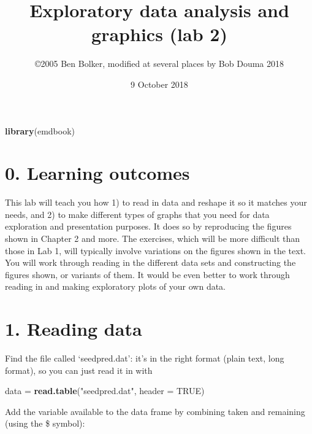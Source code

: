 \documentclass[11pt,]{article}
\title{Exploratory data analysis and graphics (lab 2)}
\author{\copyright 2005 Ben Bolker, modified at several places by Bob Douma 2018}
\date{9 October 2018}
\newenvironment{Shaded}{\begin{snugshade}}{\end{snugshade}}
\newcommand{\KeywordTok}[1]{\textcolor[rgb]{0.13,0.29,0.53}{\textbf{#1}}}
\newcommand{\DataTypeTok}[1]{\textcolor[rgb]{0.13,0.29,0.53}{#1}}
\newcommand{\StringTok}[1]{\textcolor[rgb]{0.31,0.60,0.02}{#1}}
\newcommand{\OtherTok}[1]{\textcolor[rgb]{0.56,0.35,0.01}{#1}}
\newcommand{\OperatorTok}[1]{\textcolor[rgb]{0.81,0.36,0.00}{\textbf{#1}}}
\newcommand{\NormalTok}[1]{#1}
\begin{document}
\maketitle

\begin{Shaded}
\begin{Highlighting}[]
\KeywordTok{library}\NormalTok{(emdbook)}
\end{Highlighting}
\end{Shaded}

\section{0. Learning outcomes}\label{learning-outcomes}

This lab will teach you how 1) to read in data and reshape it so it
matches your needs, and 2) to make different types of graphs that you
need for data exploration and presentation purposes. It does so by
reproducing the figures shown in Chapter 2 and more. The exercises,
which will be more difficult than those in Lab 1, will typically involve
variations on the figures shown in the text. You will work through
reading in the different data sets and constructing the figures shown,
or variants of them. It would be even better to work through reading in
and making exploratory plots of your own data.

\section{1. Reading data}\label{reading-data}

Find the file called `seedpred.dat': it's in the right format (plain
text, long format), so you can just read it in with

\begin{Shaded}
\begin{Highlighting}[]
\NormalTok{data =}\StringTok{ }\KeywordTok{read.table}\NormalTok{(}\StringTok{"seedpred.dat"}\NormalTok{, }\DataTypeTok{header =} \OtherTok{TRUE}\NormalTok{)}
\end{Highlighting}
\end{Shaded}

Add the variable available to the data frame by combining taken and
remaining (using the \$ symbol):

\begin{Shaded}
\end{Shaded}
\end{document}
